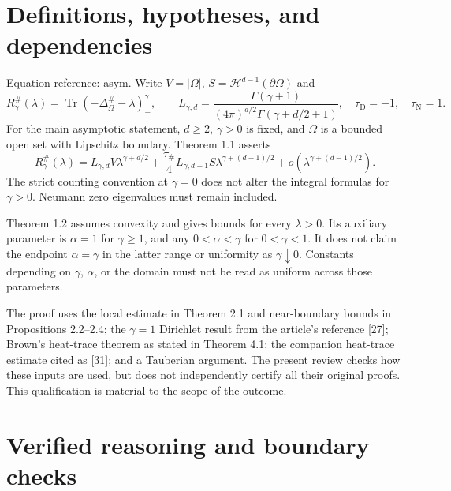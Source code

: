 \documentclass[10pt]{article}
\begin{document}
\section*{Definitions, hypotheses, and dependencies}
Equation reference: asym. Write \(V=|\Omega|\), \(S=\mathcal H^{d-1}(\partial\Omega)\) and \[R_\gamma^\#(\lambda)=\operatorname{Tr}(-\Delta_\Omega^\#-\lambda)_-^\gamma,\qquad
 L_{\gamma,d}=\frac{\Gamma(\gamma+1)}
 {(4\pi)^{d/2}\Gamma(\gamma+d/2+1)},\quad
 \tau_{\mathrm D}=-1,\quad\tau_{\mathrm N}=1.\] For the main asymptotic statement, \(d\ge2\), \(\gamma>0\) is fixed, and \(\Omega\) is a bounded open set with Lipschitz boundary. Theorem 1.1 asserts \[R_\gamma^\#(\lambda)
 =L_{\gamma,d}V\lambda^{\gamma+d/2}
 +\frac{\tau_\#}{4}L_{\gamma,d-1}S\lambda^{\gamma+(d-1)/2}
 +o(\lambda^{\gamma+(d-1)/2}).
 \] The strict counting convention at \(\gamma=0\) does not alter the integral formulas for \(\gamma>0\). Neumann zero eigenvalues must remain included.\par
Theorem 1.2 assumes convexity and gives bounds for every \(\lambda>0\). Its auxiliary parameter is \(\alpha=1\) for \(\gamma\ge1\), and any \(0<\alpha<\gamma\) for \(0<\gamma<1\). It does not claim the endpoint \(\alpha=\gamma\) in the latter range or uniformity as \(\gamma\downarrow0\). Constants depending on \(\gamma\), \(\alpha\), or the domain must not be read as uniform across those parameters.\par
The proof uses the local estimate in Theorem 2.1 and near-boundary bounds in Propositions 2.2–2.4; the \(\gamma=1\) Dirichlet result from the article’s reference [27]; Brown’s heat-trace theorem as stated in Theorem 4.1; the companion heat-trace estimate cited as [31]; and a Tauberian argument. The present review checks how these inputs are used, but does not independently certify all their original proofs. This qualification is material to the scope of the outcome.\par
\section*{Verified reasoning and boundary checks}
\end{document}
